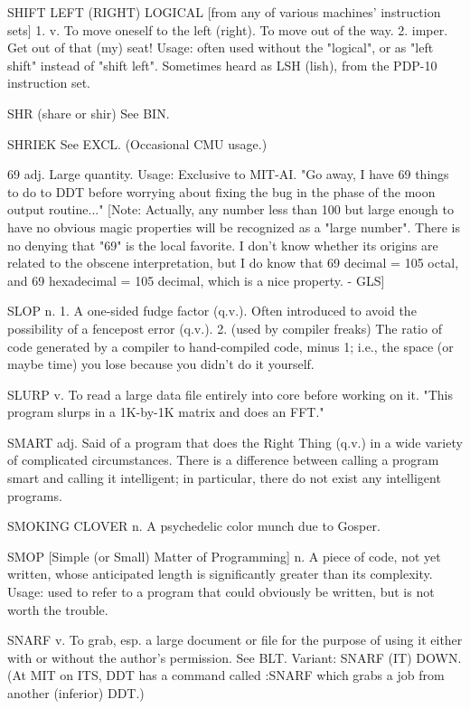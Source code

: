 SHIFT LEFT (RIGHT) LOGICAL [from any of various machines' instruction
   sets] 1. v. To move oneself to the left (right).  To move out of
   the way.  2. imper. Get out of that (my) seat!  Usage: often used
   without the "logical", or as "left shift" instead of "shift left".
   Sometimes heard as LSH (lish), from the PDP-10 instruction set.

SHR (share or shir)  See BIN.

SHRIEK	See EXCL.  (Occasional CMU usage.)

69 adj. Large quantity.	 Usage: Exclusive to MIT-AI.  "Go away, I have
   69 things to do to DDT before worrying about fixing the bug in the
   phase of the moon output routine..."
   [Note: Actually, any number less than 100 but large enough to have
   no obvious magic properties will be recognized as a "large number".
   There is no denying that "69" is the local favorite.	 I don't know
   whether its origins are related to the obscene interpretation, but
   I do know that 69 decimal = 105 octal, and 69 hexadecimal = 105
   decimal, which is a nice property. - GLS]

SLOP n. 1. A one-sided fudge factor (q.v.).  Often introduced to avoid
   the possibility of a fencepost error (q.v.).	 2. (used by compiler
   freaks) The ratio of code generated by a compiler to hand-compiled
   code, minus 1; i.e., the space (or maybe time) you lose because you
   didn't do it yourself.

SLURP v. To read a large data file entirely into core before working
   on it.  "This program slurps in a 1K-by-1K matrix and does an FFT."

SMART adj. Said of a program that does the Right Thing (q.v.) in a
   wide variety of complicated circumstances.  There is a difference
   between calling a program smart and calling it intelligent; in
   particular, there do not exist any intelligent programs.

SMOKING CLOVER n. A psychedelic color munch due to Gosper.

SMOP [Simple (or Small) Matter of Programming] n. A piece of code, not
   yet written, whose anticipated length is significantly greater than
   its complexity.  Usage: used to refer to a program that could
   obviously be written, but is not worth the trouble.

SNARF v. To grab, esp. a large document or file for the purpose of
   using it either with or without the author's permission.  See BLT.
   Variant: SNARF (IT) DOWN.  (At MIT on ITS, DDT has a command called
   :SNARF which grabs a job from another (inferior) DDT.)

